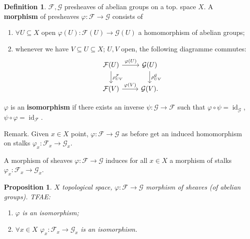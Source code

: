 \documentclass[12pt]{article}
\DeclareMathOperator{\id}{id}
\newtheorem*{proposition}{Proposition}
\theoremstyle{definition}
\newtheorem*{definition}{Definition}
\begin{document}
\begin{definition}
$\mathcal F,\mathcal G$ presheaves of abelian groups on a top. space $X$. A \textbf{morphism} of presheaves $\varphi:\mathcal F\rightarrow\mathcal G$ consists of
\begin{enumerate}[label=\arabic*)]
\item $\forall U\subseteq X$ open $\varphi(U):\mathcal F(U)\rightarrow\mathcal G(U)$ a homomorphism of abelian groups;
\item whenever we have $V\subseteq U\subseteq X$; $U,V$ open, the following diagramme commutes:
\[\begin{tikzcd}\mathcal F(U)\arrow[r,"\varphi(U)"]\arrow[d,"\rho_{UV}^\mathcal F"]&\mathcal G(U)\arrow[d,"\rho_{UV}^\mathcal G"]\\\mathcal F(V)\arrow[r,"\varphi(V)"]&\mathcal G(V).\end{tikzcd}\]
\end{enumerate}

$\varphi$ is an \textbf{isomorphism} if there exists an inverse $\psi:\mathcal G\rightarrow\mathcal F$ such that $\varphi\circ\psi=\id_{\mathcal G}$, $\psi\circ\varphi=\id_{\mathcal F}$.
\end{definition}

Remark. Given $x\in X$ point, $\varphi:\mathcal F\rightarrow\mathcal G$ as before get an induced homomorphism on stalks $\varphi_x:\mathcal F_x\rightarrow\mathcal G_x$.

A morphism of sheaves $\varphi:\mathcal F\rightarrow\mathcal G$ induces for all $x\in X$ a morphism of stalks $\varphi_x:\mathcal F_x\rightarrow\mathcal G_x$.

\begin{proposition}
$X$ topological space, $\varphi:\mathcal F\rightarrow\mathcal G$ morphism of sheaves (of abelian groups). TFAE:
\begin{enumerate}[label=\arabic*)]
\item $\varphi$ is an isomorphism;
\item $\forall x\in X$ $\varphi_x:\mathcal F_x\rightarrow\mathcal G_x$ is an isomorphism.
\end{enumerate}
\end{proposition}
\end{document}
